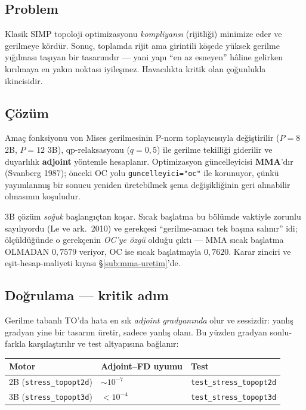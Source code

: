 \documentclass[11pt,a4paper]{article}
\begin{document}
\subsection*{Problem}

Klasik SIMP topoloji optimizasyonu \emph{kompliyansı} (rijitliği) minimize eder
ve gerilmeye kördür. Sonuç, toplamda rijit ama girintili köşede yüksek gerilme
yığılması taşıyan bir tasarımdır --- yani yapı ``en az esneyen'' hâline gelirken
kırılmaya en yakın noktası iyileşmez. Havacılıkta kritik olan çoğunlukla
ikincisidir.

\subsection*{Çözüm}

Amaç fonksiyonu von Mises gerilmesinin P-norm toplayıcısıyla değiştirilir
($P=8$ 2B, $P=12$ 3B), qp-relaksasyonu ($q=0{,}5$) ile gerilme tekilliği
giderilir ve duyarlılık \textbf{adjoint} yöntemle hesaplanır. Optimizasyon
güncelleyicisi \textbf{MMA}'dır (Svanberg 1987); önceki OC yolu
\texttt{guncelleyici="oc"} ile korunuyor, çünkü yayımlanmış bir sonucu
yeniden üretebilmek şema değişikliğinin geri alınabilir olmasının koşuludur.

3B çözüm \emph{soğuk} başlangıçtan koşar. Sıcak başlatma bu bölümde
vaktiyle zorunlu sayılıyordu (Le ve ark.\ 2010) ve gerekçesi ``gerilme-amacı
tek başına salınır'' idi; ölçüldüğünde o gerekçenin \emph{OC'ye özgü}
olduğu çıktı --- MMA sıcak başlatma OLMADAN $0{,}7579$ veriyor, OC ise sıcak
başlatmayla $0{,}7620$. Karar zinciri ve eşit-hesap-maliyeti kıyası
\S\ref{sub:mma-uretim}'de.

\subsection*{Doğrulama --- kritik adım}

Gerilme tabanlı TO'da hata en sık \emph{adjoint gradyanında} olur ve sessizdir:
yanlış gradyan yine bir tasarım üretir, sadece yanlış olanı. Bu yüzden gradyan
sonlu-farkla karşılaştırılır ve test altyapısına bağlanır:

\begin{center}\footnotesize
\begin{tabular}{@{}lll@{}}
\toprule
\textbf{Motor} & \textbf{Adjoint--FD uyumu} & \textbf{Test} \\
\midrule
2B (\texttt{stress\_topopt2d}) & $\sim10^{-7}$ & \texttt{test\_stress\_topopt2d} \\
3B (\texttt{stress\_topopt3d}) & $<10^{-4}$ & \texttt{test\_stress\_topopt3d} \\
\bottomrule
\end{tabular}
\end{center}
\end{document}
